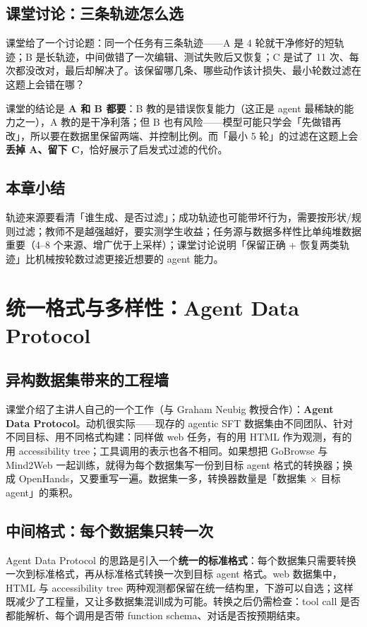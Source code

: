 \documentclass[a4paper]{article}
\begin{document}
\subsection{课堂讨论：三条轨迹怎么选}

课堂给了一个讨论题：同一个任务有三条轨迹——A 是 4 轮就干净修好的短轨迹；B 是长轨迹，中间做错了一次编辑、测试失败后又恢复；C 是试了 11 次、每次都没改对，最后却解决了。该保留哪几条、哪些动作该计损失、最小轮数过滤在这题上会错在哪？

课堂的结论是 \textbf{A 和 B 都要}：B 教的是错误恢复能力（这正是 agent 最稀缺的能力之一），A 教的是干净利落；但 B 也有风险——模型可能只学会「先做错再改」，所以要在数据里保留两端、并控制比例。而「最小 5 轮」的过滤在这题上会\textbf{丢掉 A、留下 C}，恰好展示了启发式过滤的代价。

\subsection{本章小结}
轨迹来源要看清「谁生成、是否过滤」；成功轨迹也可能带坏行为，需要按形状/规则过滤；教师不是越强越好，要实测学生收益；任务源与数据多样性比单纯堆数据重要（4--8 个来源、增广优于上采样）；课堂讨论说明「保留正确 + 恢复两类轨迹」比机械按轮数过滤更接近想要的 agent 能力。

\section{统一格式与多样性：Agent Data Protocol}

\subsection{异构数据集带来的工程墙}

课堂介绍了主讲人自己的一个工作（与 Graham Neubig 教授合作）：\textbf{Agent Data Protocol}。动机很实际——现存的 agentic SFT 数据集由不同团队、针对不同目标、用不同格式构建：同样做 web 任务，有的用 HTML 作为观测，有的用 accessibility tree；工具调用的表示也各不相同。如果想把 GoBrowse 与 Mind2Web 一起训练，就得为每个数据集写一份到目标 agent 格式的转换器；换成 OpenHands，又要重写一遍。数据集一多，转换器数量是「数据集 $\times$ 目标 agent」的乘积。

\subsection{中间格式：每个数据集只转一次}

Agent Data Protocol 的思路是引入一个\textbf{统一的标准格式}：每个数据集只需要转换一次到标准格式，再从标准格式转换一次到目标 agent 格式。web 数据集中，HTML 与 accessibility tree 两种观测都保留在统一结构里，下游可以自选；这样既减少了工程量，又让多数据集混训成为可能。转换之后仍需检查：tool call 是否都能解析、每个调用是否带 function schema、对话是否按预期结束。
\end{document}
